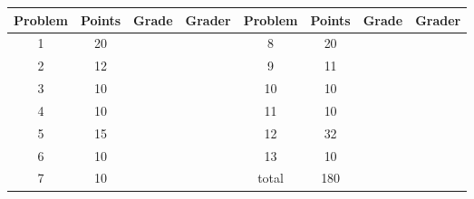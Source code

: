 \documentclass[12pt,oneside]{article}
\begin{document}
{\begin{center}
{\large
\begin{tabular}{|c|c|c|c|c|c|c|c|}
\hline
Problem & Points & Grade & Grader & Problem & Points & Grade & Grader \\ \hline \hline
1 & 20 & & & 8 & 20 & & \\ \hline
2 & 12 & & & 9 & 11 & & \\ \hline
3 & 10 & & & 10 & 10 & & \\ \hline
4 & 10 & & & 11 & 10 & & \\ \hline
5 & 15 & & & 12 & 32 & & \\ \hline
6 & 10 & & & 13 & 10 & & \\ \hline
7 & 10 & & & total & 180 & & \\ \hline
\end{tabular}
}
\end{center}
}
\instatements{\newpage}
\end{document}
